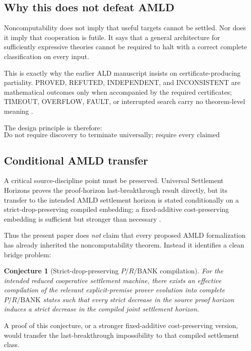 \documentclass[11pt]{article}
\newtheorem{conjecture}[definition]{Conjecture}
\theoremstyle{remark}
\newcommand{\BANK}{\ensuremath{\mathrm{BANK}}}
\begin{document}
\subsection{Why this does not defeat AMLD}

Noncomputability does not imply that useful targets cannot be settled. Nor does it imply that cooperation is futile. It says that a general architecture for sufficiently expressive theories cannot be required to halt with a correct complete classification on every input.

This is exactly why the earlier ALD manuscript insists on certificate-producing partiality. PROVED, REFUTED, INDEPENDENT, and INCONSISTENT are mathematical outcomes only when accompanied by the required certificates; TIMEOUT, OVERFLOW, FAULT, or interrupted search carry no theorem-level meaning \cite{TennesonCSII}.

The design principle is therefore:
\[
\boxed{
\text{Do not require discovery to terminate universally; require every claimed settlement to be certified.}
}
\]

\subsection{Conditional AMLD transfer}

A critical source-discipline point must be preserved. Universal Settlement Horizons proves the proof-horizon last-breakthrough result directly, but its transfer to the intended AMLD settlement horizon is stated conditionally on a strict-drop-preserving compiled embedding; a fixed-additive cost-preserving embedding is sufficient but stronger than necessary \cite{TennesonUSH}.

Thus the present paper does \emph{not} claim that every proposed AMLD formalization has already inherited the noncomputability theorem. Instead it identifies a clean bridge problem:

\begin{conjecture}[Strict-drop-preserving $P/R/\BANK$ compilation]
For the intended reduced cooperative settlement machine, there exists an effective compilation of the relevant explicit-premise prover evolution into complete $P/R/\BANK$ states such that every strict decrease in the source proof horizon induces a strict decrease in the compiled joint settlement horizon.
\end{conjecture}

A proof of this conjecture, or a stronger fixed-additive cost-preserving version, would transfer the last-breakthrough impossibility to that compiled settlement class.
\end{document}
